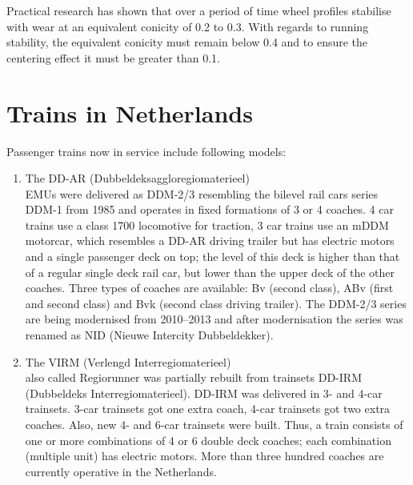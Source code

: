 Practical research has shown that over a period of time wheel profiles stabilise with wear at an equivalent conicity of 0.2 to 0.3. With regards to running stability, the equivalent conicity must remain below 0.4 and to ensure the centering effect it must be greater than 0.1.

\section{Trains in Netherlands}

Passenger trains now in service include following models:

\begin{enumerate}
    \item The DD-AR (Dubbeldeksaggloregiomaterieel) \\  EMUs were delivered as DDM-2/3 resembling the bilevel rail cars series DDM-1 from 1985 and operates in fixed formations of 3 or 4 coaches. 4 car trains use a class 1700 locomotive for traction, 3 car trains use an mDDM motorcar, which resembles a DD-AR driving trailer but has electric motors and a single passenger deck on top; the level of this deck is higher than that of a regular single deck rail car, but lower than the upper deck of the other coaches. Three types of coaches are available: Bv (second class), ABv (first and second class) and Bvk (second class driving trailer). The DDM-2/3 series are being modernised from 2010–2013 and after modernisation the series was renamed as NID (Nieuwe Intercity Dubbeldekker).
    \item The VIRM (Verlengd Interregiomaterieel) \\ also called Regiorunner was partially rebuilt from trainsets DD-IRM (Dubbeldeks Interregiomaterieel). DD-IRM was delivered in 3- and 4-car trainsets. 3-car trainsets got one extra coach, 4-car trainsets got two extra coaches. Also, new 4- and 6-car trainsets were built. Thus, a train consists of one or more combinations of 4 or 6 double deck coaches; each combination (multiple unit) has electric motors. More than three hundred coaches are currently operative in the Netherlands.

\end{enumerate}
